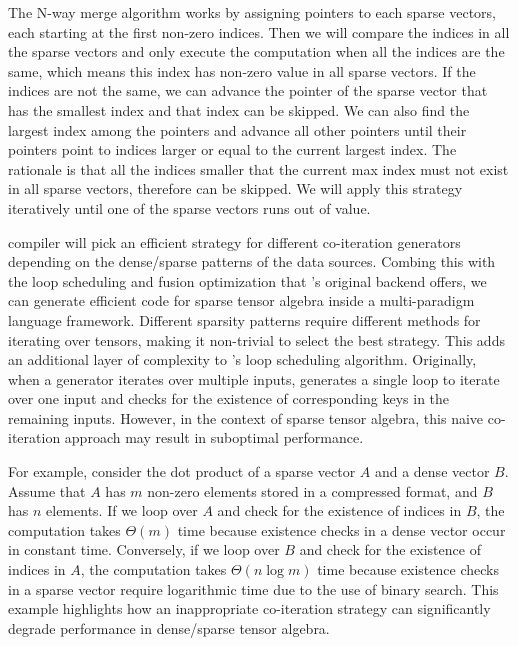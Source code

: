 \documentclass[acmsmall,nonacm]{acmart}\settopmatter{printfolios=true,printccs=false,printacmref=false}
\newcommand{\rhyme}{\text{Rhyme}\xspace}
\begin{document}
The N-way merge algorithm works by assigning pointers to each sparse vectors, each starting at the first non-zero indices. Then we will compare the indices in all the sparse vectors and only execute the computation when all the indices are the same, which means this index has non-zero value in all sparse vectors. If the indices are not the same, we can advance the pointer of the sparse vector that has the smallest index and that index can be skipped. We can also find the largest index among the pointers and advance all other pointers until their pointers point to indices larger or equal to the current largest index. The rationale is that all the indices smaller that the current max index must not exist in all sparse vectors, therefore can be skipped. We will apply this strategy iteratively until one of the sparse vectors runs out of value.\par
\rhyme compiler will pick an efficient strategy for different co-iteration generators depending on the dense/sparse patterns of the data sources. Combing this with the loop scheduling and fusion optimization that \rhyme's original backend offers, we can generate efficient code for sparse tensor algebra inside a multi-paradigm language framework.
\fi
Different sparsity patterns require different methods for iterating over tensors, making it non-trivial to select the best strategy. This adds an additional layer of complexity to \rhyme's loop scheduling algorithm. Originally, when a generator iterates over multiple inputs, \rhyme generates a single loop to iterate over one input and checks for the existence of corresponding keys in the remaining inputs. However, in the context of sparse tensor algebra, this naive co-iteration approach may result in suboptimal performance.\par
For example, consider the dot product of a sparse vector $A$ and a dense vector $B$. Assume that $A$ has $m$ non-zero elements stored in a compressed format, and $B$ has $n$ elements. If we loop over $A$ and check for the existence of indices in $B$, the computation takes $\Theta(m)$ time because existence checks in a dense vector occur in constant time. Conversely, if we loop over $B$ and check for the existence of indices in $A$, the computation takes $\Theta(n\log{}m)$ time because existence checks in a sparse vector require logarithmic time due to the use of binary search. This example highlights how an inappropriate co-iteration strategy can significantly degrade performance in dense/sparse tensor algebra.\par
\end{document}
